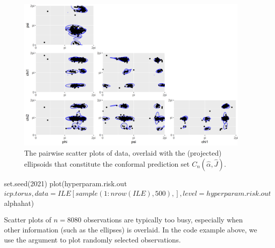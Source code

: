 \begin{figure}[t]
     \centering
     \includegraphics[scale = 0.6]{circ_ile.png} %
     \caption{The pairwise scatter plots of  data, overlaid with the (projected) ellipsoids that constitute  the conformal prediction set $C_n(\hat\alpha,\hat{J})$.}
     \label{fig:circ_ile}
\end{figure}

\begin{example}
set.seed(2021)
plot(hyperparam.risk.out$icp.torus, 
     data = ILE[sample(1:nrow(ILE),500),], 
     level = hyperparam.risk.out$alphahat) 
\end{example} 

Scatter plots of $n = 8080$ observations are typically too busy, especially when other information (such as the ellipses) is overlaid. In the code example above, we use the argument   to plot randomly selected observations. 











